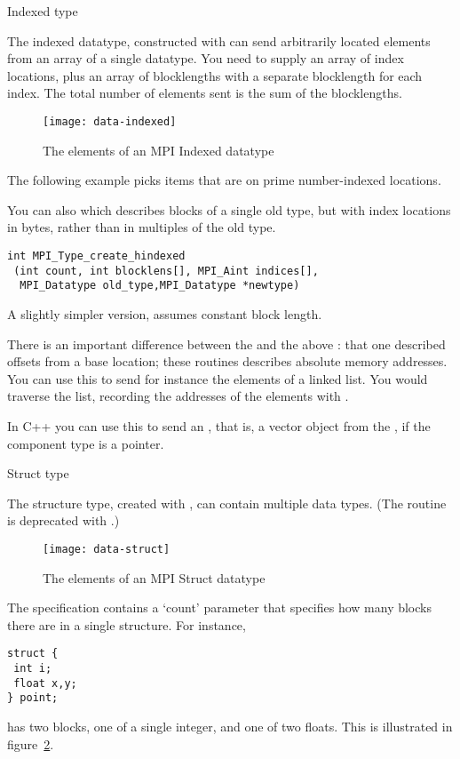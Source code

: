  {Indexed type}
\label{sec:data:indexed}

The indexed datatype, constructed with 
can send arbitrarily located elements from an array of a single datatype.
You need to supply an array of index locations, plus an array of blocklengths
with a separate blocklength for each index. The total number of elements sent
is the sum of the blocklengths.

\begin{figure}[ht]
  \texttt{[image: data-indexed]}
  \caption{The elements of an MPI Indexed datatype}
  \label{fig:data-indexed}
\end{figure}

The following example picks items that are on prime number-indexed
locations.
%
%

You can also  which describes blocks
of a single old type, but with index locations in bytes, rather than
in multiples of the old type.
\begin{lstlisting}
int MPI_Type_create_hindexed
 (int count, int blocklens[], MPI_Aint indices[],
  MPI_Datatype old_type,MPI_Datatype *newtype)
\end{lstlisting}
A slightly simpler version,
assumes constant block length.

There is an important difference between the  and the
above : that one described offsets from
a base location; these routines describes absolute memory addresses.
You can use this to send for instance the elements of a linked
list. You would traverse the list, recording the addresses of the
elements with .

In C++ you can use this to
send an , that
is, a vector object from the , if
the component type is a pointer.

 {Struct type}
\label{sec:data:struct}

The structure type, created with ,
can contain multiple data types. (The routine
 is deprecated with .)
%
\begin{figure}[ht]
  \texttt{[image: data-struct]}
  \caption{The elements of an MPI Struct datatype}
  \label{fig:data-struct}
\end{figure}
%
The specification contains a `count' parameter that specifies how many blocks
there are in a single structure. For instance,
\begin{lstlisting}
struct {
 int i;
 float x,y;
} point;
\end{lstlisting}
has two blocks, one of a single integer, and one of two floats.
This is illustrated in figure~\ref{fig:data-struct}.

